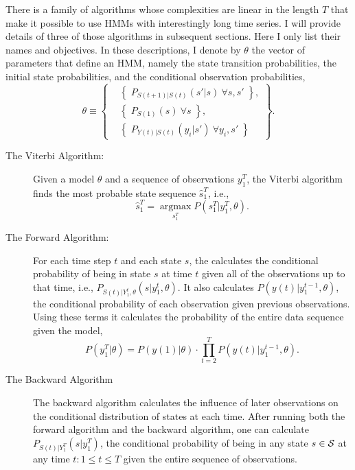 \documentclass[]{article}
\newcommand{\parameters}{\theta}
\newcommand{\ts}[3]{#1_{#2}^{#3}}                    %
\newcommand{\argmax}{\operatorname*{argmax}}
\newcommand{\ti}[2]{{#1}{(#2)}}                  %
\newcommand{\states}{{\cal S}}
\newcommand{\ie}{i.e.\xspace}
\begin{document}
There is a family of algorithms whose complexities are linear in the
length $T$ that make it possible to use HMMs with interestingly long
time series.  I will provide details of three of those algorithms in
subsequent sections.  Here I only list their names and objectives.  In
these descriptions, I denote by $\parameters$ the vector of
parameters that define an HMM, namely the state transition
probabilities, the initial state probabilities, and the conditional
observation probabilities,
\begin{equation*}
   \parameters \equiv \left\{
     \begin{aligned}
       &\left\{\; P_{\ti{S}{t+1}|\ti{S}{t}} \left(s'|s
       \right)~\forall s,s' \;\right\},\\
       & \left\{\; P_{\ti{S}{1}} \left(s \right)~\forall s
       \;\right\},\\
       &  \left\{\; P_{\ti{Y}{t}|\ti{S}{t}} \left(y_i|s' \right)
       ~ \forall y_i,s' \;\right\}
     \end{aligned}
   \right\}.
\end{equation*}
\begin{description}
\item[The Viterbi Algorithm:]  Given a model
  $\parameters$ and a sequence of observations $\ts{y}{1}{T}$, the
  Viterbi algorithm finds the most probable state sequence $\ts{\hat
    s}{1}{T}$, \ie,
  \begin{equation}
    \label{eq:intro-viterbi}
    \ts{\hat s}{1}{T} = \argmax_{\ts{s}{1}{T}} P
    \left(\ts{s}{1}{T}|\ts{y}{1}{T},\parameters\right).
  \end{equation}
\item[The Forward Algorithm:] For each time step $t$ and each state
  $s$, the  calculates the conditional
  probability of being in state $s$ at time $t$ given all of the
  observations up to that time, \ie,
  $P_{\ti{S}{t}|\ts{Y}{1}{t},\parameters} \left(s|\ts{y}{1}{t},
    \parameters \right)$. It also calculates
  $P\left(\ti{y}{t}|\ts{y}{1}{t-1}, \parameters \right)$, the
  conditional probability of each observation given previous
  observations.  Using these terms it calculates the probability of
  the entire data sequence given the model,
  \begin{equation*}
    P \left(\ts{y}{1}{T}|\parameters \right) =  P \left(\ti{y}{1}
      |\parameters \right) \cdot  \prod_{t=2}^T P
    \left(\ti{y}{t}|\ts{y}{1}{t-1}, \parameters \right).
  \end{equation*}
\item[The Backward Algorithm] The  backward
  algorithm calculates the influence of later observations on the
  conditional distribution of states at each time.  After running both
  the forward algorithm and the backward algorithm, one can calculate
  $P_{\ti{S}{t}|\ts{Y}{1}{T}} \left(s|\ts{y}{1}{T} \right)$, the
  conditional probability of being in any state $s \in \states$ at any
  time $t: 1\leq t \leq T$ given the entire sequence of observations.
\end{description}
\end{document}
